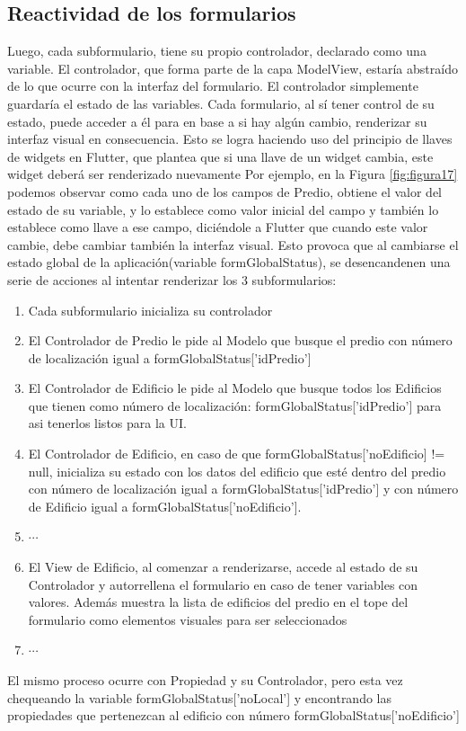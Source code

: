 \subsection{Reactividad de los formularios}
Luego, cada subformulario, tiene su propio controlador, declarado como una variable. El controlador,
que forma parte de la capa ModelView, estaría abstraído de lo que ocurre con la interfaz del formulario. El controlador simplemente guardaría el estado
de las variables. Cada formulario, al sí tener control de su estado, puede acceder a él para en base a si hay algún cambio, renderizar su interfaz visual en consecuencia.
Esto se logra haciendo uso del principio de llaves de widgets en Flutter, que plantea que si una llave de un widget cambia, este widget deberá ser renderizado nuevamente
Por ejemplo, en la Figura \ref{fig:figura17} podemos observar como cada uno de los campos de Predio, obtiene el valor del estado de su variable, y lo establece como
valor inicial del campo y también lo establece como llave a ese campo, diciéndole a Flutter que cuando este valor cambie, debe cambiar también la interfaz visual. Esto provoca que
al cambiarse el estado global de la aplicación(variable formGlobalStatus), se desencandenen una serie de acciones al intentar renderizar los 3 subformularios:
\begin{enumerate}
    \item Cada subformulario inicializa su controlador
    \item El Controlador de Predio le pide al Modelo que busque el predio con número de localización igual a formGlobalStatus['idPredio']
    \item El Controlador de Edificio le pide al Modelo que busque todos los Edificios que tienen como número de localización: formGlobalStatus['idPredio'] para asi tenerlos listos para la UI.
    \item El Controlador de Edificio, en caso de que formGlobalStatus['noEdificio] != null, inicializa su estado con los datos del edificio que esté dentro del predio con número de localización igual a
          formGlobalStatus['idPredio'] y con número de Edificio igual a formGlobalStatus['noEdificio'].
    \item $\cdots$
    \item El View de Edificio, al comenzar a renderizarse, accede al estado de su Controlador y autorrellena el formulario en caso de tener variables con valores. Además muestra la lista de edificios del predio en el tope del formulario como elementos visuales para ser seleccionados
    \item $\cdots$
\end{enumerate}
El mismo proceso ocurre con Propiedad y su Controlador, pero esta vez chequeando la variable formGlobalStatus['noLocal'] y encontrando las propiedades que pertenezcan al edificio con número formGlobalStatus['noEdificio']\\
